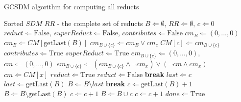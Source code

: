 \documentclass[authoryear,11pt]{elsarticle}
\begin{document}
	\begin{algorithm}
	\caption{GCSDM algorithm for computing all reducts}
	\label{alg:GCSDM}
	\begin{algorithmic}[1]
	  \Require Sorted $SDM$
      \Ensure $RR$ - the complete set of reducts
	  \State $B \Leftarrow \emptyset$, $RR \Leftarrow \emptyset$, $c \Leftarrow 0$
	  \State $reduct \Leftarrow \mathrm{False}$, $superReduct \Leftarrow \mathrm{False}$, 
	  		 $contributes \Leftarrow \mathrm{False}$
	  	\label{line:emptyB}
	  		\State $cm_B \Leftarrow (0,...,0)$
	  	\Else
	  		\State $cm_B \Leftarrow CM[\mathrm{getLast}(B)]$\label{line:notEmpty}
	  	\EndIf
	  	\State $cm_{B\cup \lbrace c\rbrace} \Leftarrow cm_B \vee cm_c$\label{line:updateCM}
	  	\State $CM[c] \Leftarrow cm_{B\cup \lbrace c\rbrace}$
	  	\label{line:contrib}
	  		\State $contributes \Leftarrow \mathrm{True}$
	  		\label{line:superReduct}
	  			\State $superReduct \Leftarrow \mathrm{True}$
	  			\State $em_{B\cup \lbrace c\rbrace} \Leftarrow (0,...,0)$, $cm \Leftarrow (0,...,0)$
	  			 \label{line:em}
	  				\State $em_{B\cup \lbrace c\rbrace} \Leftarrow (em_{B\cup \lbrace c\rbrace}\wedge \neg 
	  						cm_x) \vee (\neg cm \wedge cm_x)$
	  				\State $cm \Leftarrow CM[x]$\label{line:emEnd}
	  			\EndFor
	  			\State $reduct \Leftarrow \mathrm{True}$\label{line:reduct}
	  					\State $reduct \Leftarrow \mathrm{False}$
	  					\State \textbf{break}\label{line:reductEnd}
	  				\EndIf
	  			\EndFor
	  		\EndIf
	  	\EndIf
	  	 \label{line:cg}
	  		 \label{line:gap}
	  			\State $last \Leftarrow c$
	  				\State $last \Leftarrow \mathrm{getLast}(B)$
	  				\State $B \Leftarrow B\setminus last$
	  					\State \textbf{break}\label{line:gapEnd}
	  				\EndIf
	  			\EndWhile
	  		\EndIf
	  		\State $c \Leftarrow  \mathrm{getLast}(B)+1$
	  		\State $B \Leftarrow B\setminus \mathrm{getLast}(B)$\label{line:remLast}
	  	\Else
	  			\State $c \Leftarrow c+1$\label{line:replaceC}
	  		 \EndIf
	  			\State $B \Leftarrow B\cup c$\label{line:add1}
	  			\State $c \Leftarrow c+1$\label{line:add1End}
	  		 \EndIf
	  	\EndIf
	  	 \label{line:done}
	  		\State $done \Leftarrow \mathrm{True}$
	  	\EndIf
	  \EndWhile 
	\end{algorithmic}
	\end{algorithm}
	
\end{document}
